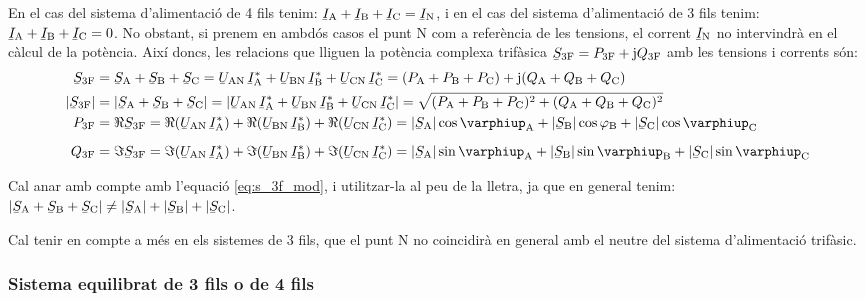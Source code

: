 En el cas del sistema d'alimentació de 4 fils tenim:
$\cmplx{I}\ped{A}+\cmplx{I}\ped{B}+\cmplx{I}\ped{C}=\cmplx{I}\ped{N}$, i
en el cas del sistema d'alimentació de 3 fils tenim:
$\cmplx{I}\ped{A}+\cmplx{I}\ped{B}+\cmplx{I}\ped{C}=0$. No obstant,
si prenem en ambdós casos el punt N com a referència de les
tensions, el corrent $\cmplx{I}\ped{N}$ no intervindrà en el càlcul de
la potència. Així doncs, les relacions que lliguen la potència
complexa trifàsica $\cmplx{S}\ped{3F} = P\ped{3F} + \ju Q\ped{3F}$
amb les tensions i corrents són:
\begin{align}
    \cmplx{S}\ped{3F} &= \cmplx{S}\ped{A} + \cmplx{S}\ped{B} + \cmplx{S}\ped{C} =
     \cmplx{U}\ped{AN}\, \cmplx{I}\ped{A}^* +
    \cmplx{U}\ped{BN} \,\cmplx{I}\ped{B}^* +  \cmplx{U}\ped{CN}\, \cmplx{I}\ped{C}^* =
    (P\ped{A} + P\ped{B} + P\ped{C}) + \ju (Q\ped{A} + Q\ped{B} + Q\ped{C}) \label{eq:s_3f} \\
    |\cmplx{S}\ped{3F}| &= |\cmplx{S}\ped{A} + \cmplx{S}\ped{B} + \cmplx{S}\ped{C}| =
    |\cmplx{U}\ped{AN}\, \cmplx{I}\ped{A}^* +
    \cmplx{U}\ped{BN} \,\cmplx{I}\ped{B}^* +  \cmplx{U}\ped{CN}\, \cmplx{I}\ped{C}^*| =
    \sqrt{(P\ped{A} + P\ped{B} + P\ped{C})^2 + (Q\ped{A} + Q\ped{B} + Q\ped{C})^2} \label{eq:s_3f_mod} \\
    P\ped{3F} &= \Re\cmplx{S}\ped{3F} = \Re(\cmplx{U}\ped{AN} \,\cmplx{I}\ped{A}^*) +
    \Re(\cmplx{U}\ped{BN} \,\cmplx{I}\ped{B}^*) +  \Re(\cmplx{U}\ped{CN}\,
    \cmplx{I}\ped{C}^*) = |\cmplx{S}\ped{A}| \cos \varphiup\ped{A} + |\cmplx{S}\ped{B}| \cos
    \varphi\ped{B} + |\cmplx{S}\ped{C}| \cos \varphiup\ped{C} \\[2mm]
    Q\ped{3F} &= \Im\cmplx{S}\ped{3F} = \Im(\cmplx{U}\ped{AN} \,\cmplx{I}\ped{A}^*) +
    \Im(\cmplx{U}\ped{BN} \,\cmplx{I}\ped{B}^*) +  \Im(\cmplx{U}\ped{CN}\,
    \cmplx{I}\ped{C}^*) = |\cmplx{S}\ped{A}| \sin \varphiup\ped{A} + |\cmplx{S}\ped{B}| \sin
    \varphiup\ped{B} + |\cmplx{S}\ped{C}| \sin \varphiup\ped{C}
\end{align}

Cal anar amb compte amb l'equació \eqref{eq:s_3f_mod}, i utilitzar-la al
peu de la lletra, ja
que en general tenim: $|\cmplx{S}\ped{A} + \cmplx{S}\ped{B} + \cmplx{S}\ped{C}| \neq
|\cmplx{S}\ped{A}| + |\cmplx{S}\ped{B}| + |\cmplx{S}\ped{C}|$.

Cal tenir en compte a més en els sistemes de 3 fils, que el punt
N no coincidirà en general amb el neutre del sistema
d'alimentació trifàsic.

\subsubsection{Sistema equilibrat de 3 fils o de 4 fils}

